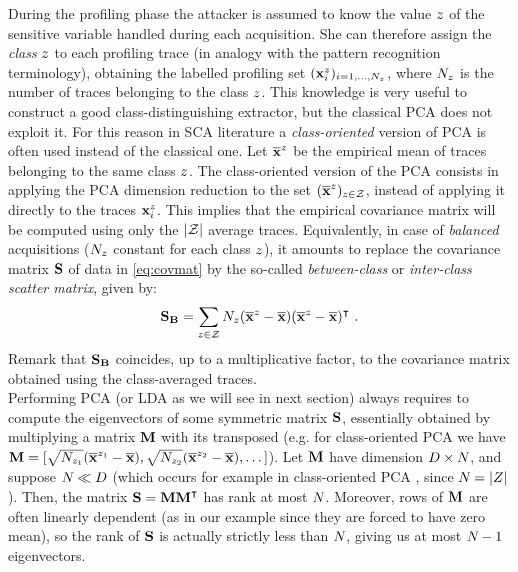 During the profiling phase the attacker is assumed to know the value $\sensVar$ of the sensitive variable handled during each acquisition. She can therefore assign the {\em class} $\sensVar$ to each profiling trace  (in analogy with the pattern recognition terminology), obtaining the labelled profiling set $(\sss{i})_{i=1,\dots,\numTraces}$, where $\numTraces$ is the number of traces belonging to the class $\sensVar$. This knowledge is very useful to construct a good class-distinguishing extractor, but the classical PCA does not exploit it. For this reason in SCA literature \cite{TAprincipal,choudaryefficient,choudary2014efficient,disassembler,Standaert2008}  a {\em class-oriented} version of PCA is often used instead of the classical one. Let $\mmmXclass$ be the empirical mean of traces belonging to the same class $\sensVar$. The class-oriented version of the PCA  consists in applying the PCA dimension reduction to the set $(\mmmXclass)_{\sensVar \in \sensVarSet}$, instead of applying it directly to the traces $\sss{i}$. This implies that the empirical covariance matrix will be computed using only the $\lvert \sensVarSet \rvert$ average traces. Equivalently, in case of \textit{balanced} acquisitions ($\numTraces$ constant for each class $\sensVar$), it amounts to replace the covariance matrix $\covmat$ of data in \eqref{eq:covmat}  by the so-called {\em between-class} or  {\em inter-class scatter matrix}, given by:
\begin{equation}\label{eq:SB}
\SB = \sum_{\sensVar\in\sensVarSet}\numTraces(\mmmXclass-\mmmX)(\mmmXclass-\mmmX)^\intercal \mbox{ .}
\end{equation}
Remark that $\SB$ coincides, up to a multiplicative factor, to the covariance matrix obtained using the class-averaged traces.\\

Performing PCA (or LDA as we will see in next section) always requires to compute the eigenvectors of some symmetric matrix $\covmat$, essentially obtained by multiplying a matrix $\measuresMatrix$ with its transposed (e.g. for class-oriented PCA we have $\measuresMatrix = [\sqrt{\numTraces[\sensVar_1]}(\mmmXclass[\sensVar_1]-\mmmX),\sqrt{\numTraces[\sensVar_2]}(\mmmXclass[\sensVar_2]-\mmmX), \dots ]$). Let $\measuresMatrix$ have dimension $\traceLength\times\numTraces[]$, and suppose $\numTraces[]\ll \traceLength$ (which occurs for example in class-oriented PCA , since $\numTraces[]=\lvert \sensRandVar \rvert$). Then, the matrix $\covmat=\measuresMatrix\measuresMatrix^\intercal$ has rank at most $\numTraces[]$. Moreover, rows of $\measuresMatrix$ are often linearly dependent (as in our example since they are forced to have zero mean), so the rank of $\covmat$ is actually strictly less than $\numTraces[]$, giving us at most $\numTraces[]-1$ eigenvectors.\\

